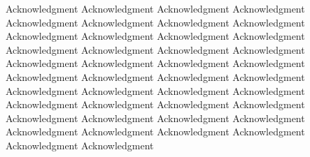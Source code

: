 \acknowledgements

Acknowledgment Acknowledgment Acknowledgment Acknowledgment Acknowledgment Acknowledgment Acknowledgment Acknowledgment Acknowledgment Acknowledgment Acknowledgment Acknowledgment Acknowledgment Acknowledgment Acknowledgment Acknowledgment Acknowledgment Acknowledgment Acknowledgment Acknowledgment Acknowledgment Acknowledgment Acknowledgment Acknowledgment Acknowledgment Acknowledgment Acknowledgment Acknowledgment Acknowledgment Acknowledgment Acknowledgment Acknowledgment Acknowledgment Acknowledgment Acknowledgment Acknowledgment Acknowledgment Acknowledgment Acknowledgment Acknowledgment Acknowledgment Acknowledgment 